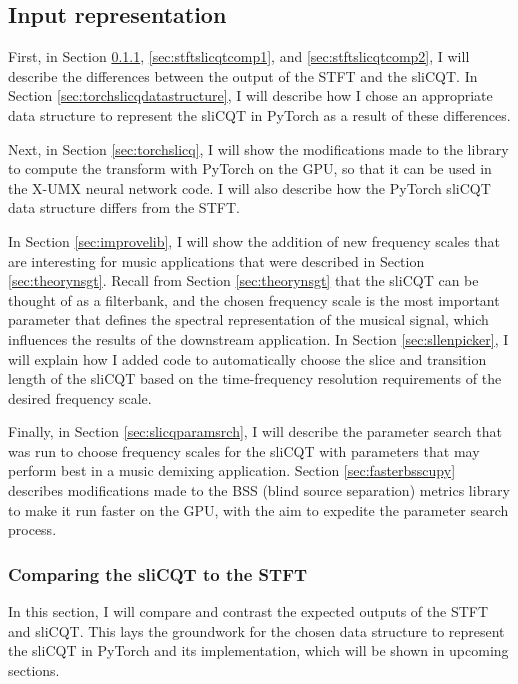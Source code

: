 \documentclass[report.tex]{subfiles}
\begin{document}
\subsection{Input representation}
\label{sec:inputrepresentation}

First, in Section \ref{sec:stftslicqtcomp}, \ref{sec:stftslicqtcomp1}, and \ref{sec:stftslicqtcomp2}, I will describe the differences between the output of the STFT and the sliCQT. In Section \ref{sec:torchslicqdatastructure}, I will describe how I chose an appropriate data structure to represent the sliCQT in PyTorch as a result of these differences.

Next, in Section \ref{sec:torchslicq}, I will show the modifications made to the library to compute the transform with PyTorch on the GPU, so that it can be used in the X-UMX neural network code. I will also describe how the PyTorch sliCQT data structure differs from the STFT.

In Section \ref{sec:improvelib}, I will show the addition of new frequency scales that are interesting for music applications that were described in Section \ref{sec:theorynsgt}. Recall from Section \ref{sec:theorynsgt} that the sliCQT can be thought of as a filterbank, and the chosen frequency scale is the most important parameter that defines the spectral representation of the musical signal, which influences the results of the downstream application. In Section \ref{sec:sllenpicker}, I will explain how I added code to automatically choose the slice and transition length of the sliCQT based on the time-frequency resolution requirements of the desired frequency scale.

Finally, in Section \ref{sec:slicqparamsrch}, I will describe the parameter search that was run to choose frequency scales for the sliCQT with parameters that may perform best in a music demixing application. Section \ref{sec:fasterbsscupy} describes modifications made to the BSS (blind source separation) metrics library to make it run faster on the GPU, with the aim to expedite the parameter search process.

\subsubsection{Comparing the sliCQT to the STFT}
\label{sec:stftslicqtcomp}

In this section, I will compare and contrast the expected outputs of the STFT and sliCQT. This lays the groundwork for the chosen data structure to represent the sliCQT in PyTorch and its implementation, which will be shown in upcoming sections.
\end{document}
